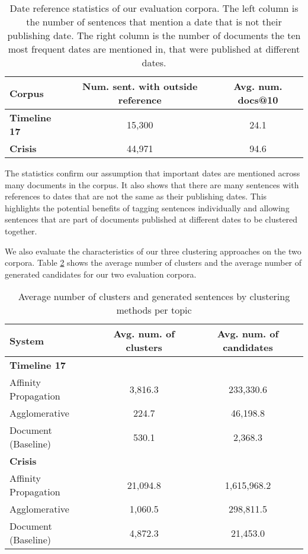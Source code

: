 \documentclass[a4paper,BCOR=10mm]{report}
\numberwithin{lemma}{chapter}
\numberwithin{definition}{chapter}
\begin{document}
\begin{table}
\begin{centering}
\begin{tabular}{|l|cc|}
\hline
Corpus & Num. sent. with outside reference & Avg. num. docs@10 \\\hline
\textbf{Timeline 17} & 15,300 & 24.1 \\
\textbf{Crisis} & 44,971 & 94.6 \\\hline
\end{tabular}
\end{centering}

\caption{Date reference statistics of our evaluation corpora. The left column is the number of sentences that mention a date that is not their publishing date. The right column is the number of documents the ten most frequent dates are mentioned in, that were published at different dates.}
\label{tab:datestats}
\end{table}

The statistics confirm our assumption that important dates are mentioned across many documents in the corpus. It also shows that there are many sentences with references to dates that are not the same as their publishing dates. This highlights the potential benefits of tagging sentences individually and allowing sentences that are part of documents published at different dates to be clustered together.

We also evaluate the characteristics of our three clustering approaches on the two corpora.
Table \ref{tab:genstats} shows the average number of clusters and the average number of generated candidates for our two evaluation corpora.

\begin{table}
\begin{centering}
\begin{tabular}{|l|cc|}
\hline
System & Avg. num. of clusters & Avg. num. of candidates \\\hline
\multicolumn{3}{|l|}{\textbf{Timeline 17}}\\\hline
Affinity Propagation & 3,816.3 & 233,330.6 \\
Agglomerative  & 224.7 & 46,198.8 \\
Document (Baseline) & 530.1 & 2,368.3 \\\hline
\multicolumn{3}{|l|}{\textbf{Crisis}}\\\hline
Affinity Propagation & 21,094.8 & 1,615,968.2 \\
Agglomerative & 1,060.5 & 298,811.5 \\
Document (Baseline) & 4,872.3 & 21,453.0 \\\hline
\end{tabular}
\end{centering}
\caption{Average number of clusters and generated sentences by clustering methods per topic}
\label{tab:genstats}
\end{table}
\end{document}

